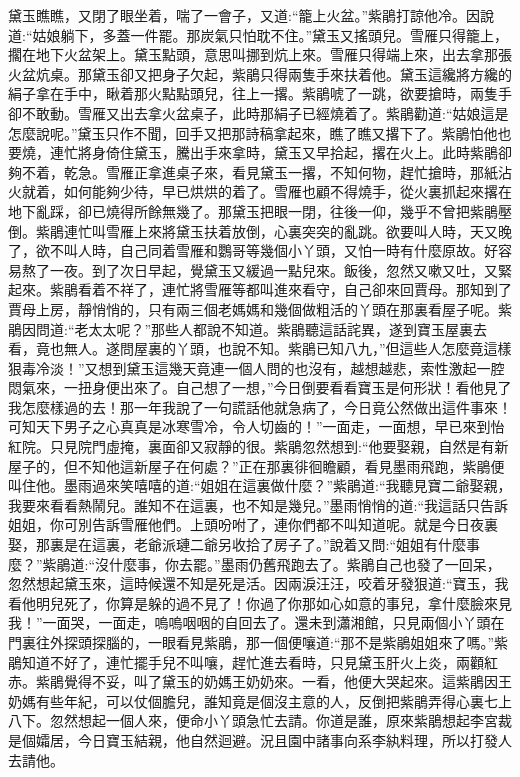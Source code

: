 \begin{parag}
    黛玉瞧瞧，又閉了眼坐着，喘了一會子，又道:“籠上火盆。”紫鵑打諒他冷。因說道:“姑娘躺下，多蓋一件罷。那炭氣只怕耽不住。”黛玉又搖頭兒。雪雁只得籠上，擱在地下火盆架上。黛玉點頭，意思叫挪到炕上來。雪雁只得端上來，出去拿那張火盆炕桌。那黛玉卻又把身子欠起，紫鵑只得兩隻手來扶着他。黛玉這纔將方纔的絹子拿在手中，瞅着那火點點頭兒，往上一撂。紫鵑唬了一跳，欲要搶時，兩隻手卻不敢動。雪雁又出去拿火盆桌子，此時那絹子已經燒着了。紫鵑勸道:“姑娘這是怎麼說呢。”黛玉只作不聞，回手又把那詩稿拿起來，瞧了瞧又撂下了。紫鵑怕他也要燒，連忙將身倚住黛玉，騰出手來拿時，黛玉又早拾起，撂在火上。此時紫鵑卻夠不着，乾急。雪雁正拿進桌子來，看見黛玉一撂，不知何物，趕忙搶時，那紙沾火就着，如何能夠少待，早已烘烘的着了。雪雁也顧不得燒手，從火裏抓起來撂在地下亂踩，卻已燒得所餘無幾了。那黛玉把眼一閉，往後一仰，幾乎不曾把紫鵑壓倒。紫鵑連忙叫雪雁上來將黛玉扶着放倒，心裏突突的亂跳。欲要叫人時，天又晚了，欲不叫人時，自己同着雪雁和鸚哥等幾個小丫頭，又怕一時有什麼原故。好容易熬了一夜。到了次日早起，覺黛玉又緩過一點兒來。飯後，忽然又嗽又吐，又緊起來。紫鵑看着不祥了，連忙將雪雁等都叫進來看守，自己卻來回賈母。那知到了賈母上房，靜悄悄的，只有兩三個老媽媽和幾個做粗活的丫頭在那裏看屋子呢。紫鵑因問道:“老太太呢？”那些人都說不知道。紫鵑聽這話詫異，遂到寶玉屋裏去看，竟也無人。遂問屋裏的丫頭，也說不知。紫鵑已知八九，”但這些人怎麼竟這樣狠毒冷淡！”又想到黛玉這幾天竟連一個人問的也沒有，越想越悲，索性激起一腔悶氣來，一扭身便出來了。自己想了一想，”今日倒要看看寶玉是何形狀！看他見了我怎麼樣過的去！那一年我說了一句謊話他就急病了，今日竟公然做出這件事來！可知天下男子之心真真是冰寒雪冷，令人切齒的！”一面走，一面想，早已來到怡紅院。只見院門虛掩，裏面卻又寂靜的很。紫鵑忽然想到:“他要娶親，自然是有新屋子的，但不知他這新屋子在何處？”正在那裏徘徊瞻顧，看見墨雨飛跑，紫鵑便叫住他。墨雨過來笑嘻嘻的道:“姐姐在這裏做什麼？”紫鵑道:“我聽見寶二爺娶親，我要來看看熱鬧兒。誰知不在這裏，也不知是幾兒。”墨雨悄悄的道:“我這話只告訴姐姐，你可別告訴雪雁他們。上頭吩咐了，連你們都不叫知道呢。就是今日夜裏娶，那裏是在這裏，老爺派璉二爺另收拾了房子了。”說着又問:“姐姐有什麼事麼？”紫鵑道:“沒什麼事，你去罷。”墨雨仍舊飛跑去了。紫鵑自己也發了一回呆，忽然想起黛玉來，這時候還不知是死是活。因兩淚汪汪，咬着牙發狠道:“寶玉，我看他明兒死了，你算是躲的過不見了！你過了你那如心如意的事兒，拿什麼臉來見我！”一面哭，一面走，嗚嗚咽咽的自回去了。還未到瀟湘館，只見兩個小丫頭在門裏往外探頭探腦的，一眼看見紫鵑，那一個便嚷道:“那不是紫鵑姐姐來了嗎。”紫鵑知道不好了，連忙擺手兒不叫嚷，趕忙進去看時，只見黛玉肝火上炎，兩顴紅赤。紫鵑覺得不妥，叫了黛玉的奶媽王奶奶來。一看，他便大哭起來。這紫鵑因王奶媽有些年紀，可以仗個膽兒，誰知竟是個沒主意的人，反倒把紫鵑弄得心裏七上八下。忽然想起一個人來，便命小丫頭急忙去請。你道是誰，原來紫鵑想起李宮裁是個孀居，今日寶玉結親，他自然迴避。況且園中諸事向系李紈料理，所以打發人去請他。
\end{parag}


